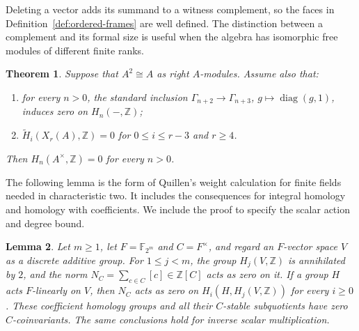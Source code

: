 \documentclass[11pt]{amsart}
\newcommand{\Z}{\mathbb Z}
\newcommand{\F}{\mathbb F}
\newtheorem{theorem}{Theorem}[section]
\newtheorem{lemma}[theorem]{Lemma}
\theoremstyle{definition}
\theoremstyle{remark}
\numberwithin{equation}{section}
\begin{document}
Deleting a vector adds its summand to a witness complement, so the faces in Definition~\ref{def:ordered-frames} are well defined. The distinction between a complement and its formal size is useful when the algebra has isomorphic free modules of different finite ranks.

\begin{theorem}\label{thm:acyclicity-criterion}
Suppose that $A^2\cong A$ as right $A$-modules. Assume also that:
\begin{enumerate}
\item for every $n>0$, the standard inclusion $\Gamma_{n+2}\to\Gamma_{n+3}$, $g\mapsto\operatorname{diag}(g,1)$, induces zero on $H_n(-,\Z)$;
\item $\widetilde H_i(X_r(A),\Z)=0$ for $0\leq i\leq r-3$ and $r\geq4$.
\end{enumerate}
Then $H_n(A^\times,\Z)=0$ for every $n>0$.
\end{theorem}

The following lemma is the form of Quillen's weight calculation for finite fields \cite[\S11, Lemmas~15--16]{Quillen72} needed in characteristic two. It includes the consequences for integral homology and homology with coefficients. We include the proof to specify the scalar action and degree bound.

\begin{lemma}\label{lem:scalar-homology}
Let $m\geq1$, let $F=\F_{2^m}$ and $C=F^\times$, and regard an $F$-vector space $V$ as a discrete additive group. For $1\leq j<m$, the group $H_j(V,\Z)$ is annihilated by $2$, and the norm $N_C=\sum_{c\in C}[c]\in\Z[C]$ acts as zero on it. If a group $H$ acts $F$-linearly on $V$, then $N_C$ acts as zero on $H_i(H,H_j(V,\Z))$ for every $i\geq0$. These coefficient homology groups and all their $C$-stable subquotients have zero $C$-coinvariants. The same conclusions hold for inverse scalar multiplication.
\end{lemma}
\end{document}
